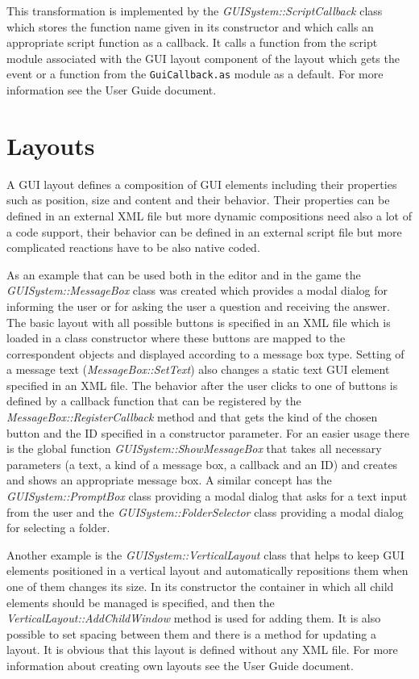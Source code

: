 \documentclass[a4paper, 12pt]{report}
\begin{document}
This transformation is implemented by the \emph{GUISystem::ScriptCallback} class which stores the function name given in its constructor and which calls an appropriate script function as a callback. It calls a function from the script module associated with the GUI layout component of the layout which gets the event or a function from the \verb/GuiCallback.as/ module as a default. For more information see the User Guide document.

\section{Layouts}
\label{sec:gui-layouts}

A GUI layout defines a composition of GUI elements including their properties such as position, size and content and their behavior. Their properties can be defined in an external XML file but more dynamic compositions need also a lot of a code support, their behavior can be defined in an external script file but more complicated reactions have to be also native coded.

As an example that can be used both in the editor and in the game the \emph{GUISystem::MessageBox} class was created which provides a modal dialog for informing the user or for asking the user a question and receiving the answer. The basic layout with all possible buttons is specified in an XML file which is loaded in a class constructor where these buttons are mapped to the correspondent objects and displayed according to a message box type. Setting of a message text (\emph{MessageBox::SetText}) also changes a static text GUI element specified in an XML file. The behavior after the user clicks to one of buttons is defined by a callback function that can be registered by the \emph{MessageBox::RegisterCallback} method and that gets the kind of the chosen button and the ID specified in a constructor parameter. For an easier usage there is the global function \emph{GUISystem::ShowMessageBox} that takes all necessary parameters (a text, a kind of a message box, a callback and an ID) and creates and shows an appropriate message box. A similar concept has the \emph{GUISystem::PromptBox} class providing a modal dialog that asks for a text input from the user and the \emph{GUISystem::FolderSelector} class providing a modal dialog for selecting a folder.

Another example is the \emph{GUISystem::VerticalLayout} class that helps to keep GUI elements positioned in a vertical layout and automatically repositions them when one of them changes its size. In its constructor the container in which all child elements should be managed is specified, and then the \emph{VerticalLayout::AddChildWindow} method is used for adding them. It is also possible to set spacing between them and there is a method for updating a layout. It is obvious that this layout is defined without any XML file. For more information about creating own layouts see the User Guide document.
\end{document}
